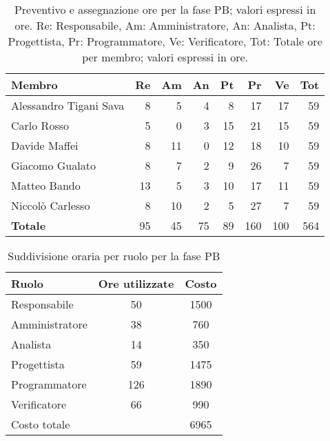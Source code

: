 \begin{table}[H]
	\renewcommand{\arraystretch}{1.5}
	\centering
	\begin{tabular}{l|r|r|r|r|r|r|r}
		\textbf{Membro}        & \textbf{Re} & \textbf{Am} & \textbf{An}  & \textbf{Pt}
		                       & \textbf{Pr} & \textbf{Ve} & \textbf{Tot}                                 \\
		\hline
		Alessandro Tigani Sava & 8           & 5           & 4            & 8           & 17  & 17  & 59  \\
		Carlo Rosso            & 5           & 0           & 3            & 15          & 21  & 15  & 59  \\
		Davide Maffei          & 8           & 11          & 0            & 12          & 18  & 10  & 59  \\
		Giacomo Gualato        & 8           & 7           & 2            & 9           & 26  & 7   & 59  \\
		Matteo Bando           & 13          & 5           & 3            & 10          & 17  & 11  & 59  \\
		Niccolò Carlesso       & 8           & 10          & 2            & 5           & 27  & 7   & 59  \\
		\hline
		\textbf{Totale}        & 95          & 45          & 75           & 89          & 160 & 100 & 564 \\
	\end{tabular}

	\caption{Preventivo e assegnazione ore per la fase PB; valori espressi in ore.
		Re: Responsabile, Am: Amministratore, An: Analista, Pt:
		Progettista, Pr: Programmatore, Ve: Verificatore, Tot: Totale ore per
		membro; valori espressi in ore.}
\end{table}



\begin{table}[H]
	\centering
	\begin{tabular}{l|c|c}
		\textbf{Ruolo} & \textbf{Ore utilizzate} & \textbf{Costo} \\
		\hline
		Responsabile   & 50                      & 1500           \\
		Amministratore & 38                      & 760            \\
		Analista       & 14                      & 350            \\
		Progettista    & 59                      & 1475           \\
		Programmatore  & 126                     & 1890           \\
		Verificatore   & 66                      & 990            \\
		\hline
		Costo totale   &                         & 6965           \\
	\end{tabular}
	\caption{Suddivisione oraria per ruolo per la fase PB}
\end{table}

